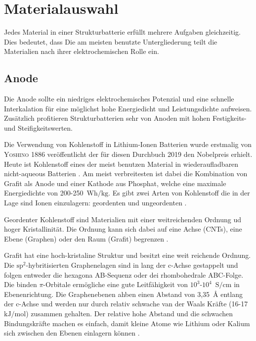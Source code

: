 \section{Materialauswahl}

Jedes  Material in einer Strukturbatterie erfüllt mehrere Aufgaben gleichzeitig. Dies bedeutet, dass 
Die am meisten benutzte Untergliederung teilt die Materialien nach ihrer elektrochemischen Rolle ein.


\subsection{Anode}
Die Anode sollte ein niedriges elektrochemisches Potenzial und eine schnelle Interkalation für eine möglichst hohe Energiedicht und Leistungsdichte aufweisen. Zusätzlich profitieren Strukturbatterien sehr von Anoden mit hohen Festigkeits- und Steifigkeitswerten.

Die Verwendung von Kohlenstoff in Lithium-Ionen Batterien wurde erstmalig von \textsc{Yoshino} \cite{Yoshino1986} 1886 veröffentlicht der für diesen Durchbuch 2019 den Nobelpreis erhielt.
Heute ist Kohlenstoff eines der meist benutzen Material in wiederaufladbaren nicht-aqueous Batterien \cite{Ahmad2021}. Am meist verbreitesten ist dabei die Kombination von Grafit als Anode und einer Kathode aus Phosphat, welche eine maximale Energiedichte von 200-250~$\si{\watt \hour \per \kg}$. 
Es gibt zwei Arten von Kohlenstoff die in der Lage sind Ionen einzulagern: geordenten und ungeordenten \cite{Ghosh2024}.

Geordenter Kohlenstoff sind Materialien mit einer weitreichenden Ordnung ud hoger Kristallinität. Die Ordnung kann sich dabei auf eine Achse (CNTs), eine Ebene (Graphen) oder den Raum (Grafit) begrenzen \cite{Wang2021}.

Grafit hat eine hoch-kristaline Struktur und besitzt eine weit reichende Ordnung. Die $\text{sp}^\text{2}$-hybritisierten Graphenelagen sind in lang der c-Achse gestappelt und folgen entweder die hexagona AB-Sequenz oder dei rhombohedrale ABC-Folge. Die binden $\pi$-Orbitale ermögliche eine gute Leitfähigkeit von $10^3$-$10^4$~$\si{\siemens \per \cm}$ in Ebenenrichtung. Die Graphenebenen ahben einen Abstand von 3,35~$\si{\angstrom}$ entlang der c-Achse und werden nur durch relativ schwache van der Waals Kräfte (16-17~$\si{\kJ \per \mol}$) zusammen gehalten. Der relative hohe Abstand und die schwachen Bindungskräfte machen es einfach, damit kleine Atome wie Lithium oder Kalium sich zwischen den Ebenen einlagern können \cite{Wang2021}.

